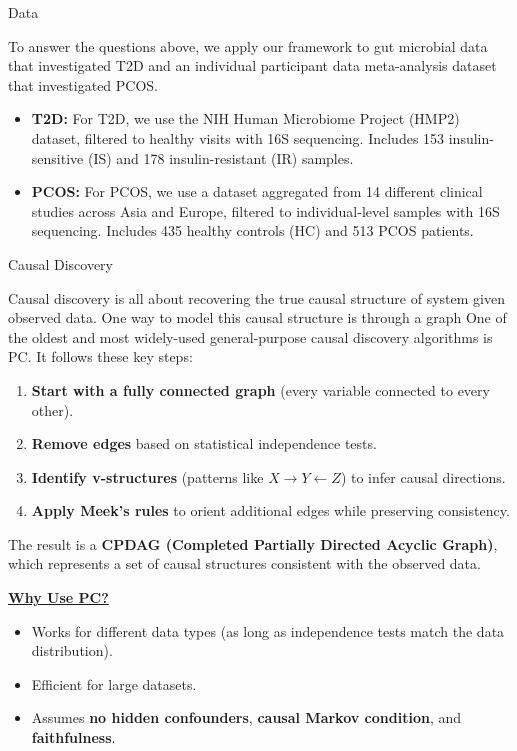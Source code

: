 \documentclass[final]{beamer}
\newlength{\colwidth}
\begin{document}
\begin{frame}[t]
\begin{columns}[t]
\begin{column}{\colwidth}
  \begin{block}{Data}

    To answer the questions above, we apply our framework to gut microbial data that investigated T2D and 
    an individual participant data meta-analysis dataset that investigated PCOS. 
    
    \begin{itemize}
      \item \textbf{T2D:} For T2D, we use the NIH Human Microbiome Project (HMP2) dataset, filtered to healthy visits with 16S sequencing. Includes 153 insulin-sensitive (IS) and 178 insulin-resistant (IR) samples.
      \item \textbf{PCOS:} For PCOS, we use a dataset aggregated from 14 different clinical studies across Asia and Europe, filtered to individual-level samples with 16S sequencing. Includes 435 healthy controls (HC) and 513 PCOS patients.
    \end{itemize}

  \end{block}
  
	  \begin{alertblock}{Causal Discovery}
	  
	  	Causal discovery is all about recovering the true causal structure of system given observed data. One way to model this causal structure is through a graph One of the oldest and most widely-used general-purpose causal discovery algorithms
		is PC. It follows these key steps:
		\begin{enumerate}
		    \item \textbf{Start with a fully connected graph} (every variable connected to every other).
		    \item \textbf{Remove edges} based on statistical independence tests.
		    \item \textbf{Identify v-structures} (patterns like $X \to Y \leftarrow Z$) to infer causal directions.
		    \item \textbf{Apply Meek’s rules} to orient additional edges while preserving consistency.
		\end{enumerate}

	The result is a \textbf{CPDAG (Completed Partially Directed Acyclic Graph)}, which represents a set of causal structures consistent with the observed data.

	\textbf{\underline{Why Use PC?}}
			\begin{itemize}
			    \item Works for different data types (as long as independence tests match the data distribution).
			    \item Efficient for large datasets.
			    \item Assumes \textbf{no hidden confounders}, \textbf{causal Markov condition}, and \textbf{faithfulness}.
			\end{itemize}
	  

\end{alertblock}
\end{column}
\end{columns}
\end{frame}
\end{document}
